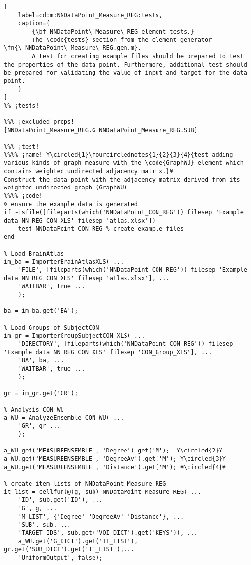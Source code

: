 \documentclass{tufte-handout}
\begin{document}
\begin{lstlisting}[
	label=cd:m:NNDataPoint_Measure_REG:tests,
	caption={
		{\bf NNDataPoint\_Measure\_REG element tests.}
		The \code{tests} section from the element generator \fn{\_NNDataPoint\_Measure\_REG.gen.m}.
		A test for creating example files should be prepared to test the properties of the data point. Furthermore, additional test should be prepared for validating the value of input and target for the data point.
	}
]		
%% ¡tests!

%%% ¡excluded_props!
[NNDataPoint_Measure_REG.G NNDataPoint_Measure_REG.SUB]

%%% ¡test!
%%%% ¡name! ¥\circled{1}\fourcirclednotes{1}{2}{3}{4}{test adding various kinds of graph measure with the \code{GraphWU} element which contains weighted undirected adjacency matrix.}¥
Construct the data point with the adjacency matrix derived from its weighted undirected graph (GraphWU) 
%%%% ¡code!
% ensure the example data is generated
if ~isfile([fileparts(which('NNDataPoint_CON_REG')) filesep 'Example data NN REG CON XLS' filesep 'atlas.xlsx'])
    test_NNDataPoint_CON_REG % create example files
end

% Load BrainAtlas
im_ba = ImporterBrainAtlasXLS( ...
    'FILE', [fileparts(which('NNDataPoint_CON_REG')) filesep 'Example data NN REG CON XLS' filesep 'atlas.xlsx'], ...
    'WAITBAR', true ...
    );

ba = im_ba.get('BA');

% Load Groups of SubjectCON
im_gr = ImporterGroupSubjectCON_XLS( ...
    'DIRECTORY', [fileparts(which('NNDataPoint_CON_REG')) filesep 'Example data NN REG CON XLS' filesep 'CON_Group_XLS'], ...
    'BA', ba, ...
    'WAITBAR', true ...
    );

gr = im_gr.get('GR');

% Analysis CON WU
a_WU = AnalyzeEnsemble_CON_WU( ...
    'GR', gr ...
    );

a_WU.get('MEASUREENSEMBLE', 'Degree').get('M');  ¥\circled{2}¥
a_WU.get('MEASUREENSEMBLE', 'DegreeAv').get('M'); ¥\circled{3}¥
a_WU.get('MEASUREENSEMBLE', 'Distance').get('M'); ¥\circled{4}¥

% create item lists of NNDataPoint_Measure_REG
it_list = cellfun(@(g, sub) NNDataPoint_Measure_REG( ...
    'ID', sub.get('ID'), ...
    'G', g, ...
    'M_LIST', {'Degree' 'DegreeAv' 'Distance'}, ...
    'SUB', sub, ...
    'TARGET_IDS', sub.get('VOI_DICT').get('KEYS')), ...
    a_WU.get('G_DICT').get('IT_LIST'), gr.get('SUB_DICT').get('IT_LIST'),...
    'UniformOutput', false);


\end{lstlisting}
\end{document}
